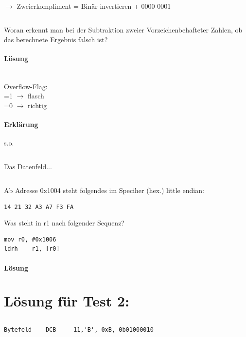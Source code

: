 \documentclass[12pt,twoside,a4paper]{article}
\begin{document}
$\rightarrow$ Zweierkompliment = Binär invertieren + 0000 0001

\subsection{}

Woran erkennt man bei der Subtraktion zweier Vorzeichenbehafteter Zahlen, ob das berechnete Ergebnis falsch ist?

\paragraph{Lösung}
\\
Overflow-Flag:\\
=1 $\rightarrow$ flasch\\
=0 $\rightarrow$ richtig

\paragraph{Erklärung}
s.o.
\subsection{}
Das Datenfeld...


\subsection{}

Ab Adresse 0x1004 steht folgendes im Speciher (hex.) little endian:
\begin{lstlisting}
14 21 32 A3 A7 F3 FA
\end{lstlisting}
Was steht in r1 nach folgender Sequenz?

\begin{lstlisting}
mov	r0, #0x1006
ldrh	r1, [r0]
\end{lstlisting}

\paragraph{Lösung}



\section{Lösung für Test 2:}
\subsection{}
\begin{lstlisting}
Bytefeld 	DCB 	11,'B', 0xB, 0b01000010
\end{lstlisting}
\end{document}
